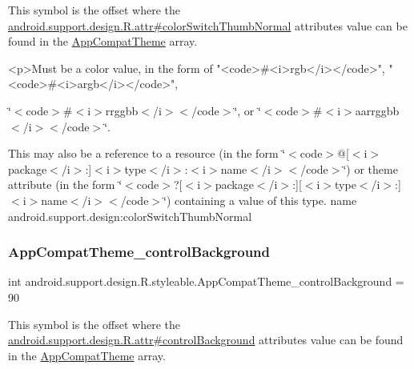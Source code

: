 This symbol is the offset where the \hyperlink{classandroid_1_1support_1_1design_1_1R_1_1attr_a64c4b3a099566cfb653a1354c14bc4dd}{android.\+support.\+design.\+R.\+attr\#color\+Switch\+Thumb\+Normal} attribute\textquotesingle{}s value can be found in the \hyperlink{classandroid_1_1support_1_1design_1_1R_1_1styleable_afb351dc8de20cbd4c89abe360373010c}{App\+Compat\+Theme} array.

\begin{DoxyVerb}      <p>Must be a color value, in the form of "<code>#<i>rgb</i></code>", "<code>#<i>argb</i></code>",
\end{DoxyVerb}
 \char`\"{}$<$code$>$\#$<$i$>$rrggbb$<$/i$>$$<$/code$>$\char`\"{}, or \char`\"{}$<$code$>$\#$<$i$>$aarrggbb$<$/i$>$$<$/code$>$\char`\"{}. 

This may also be a reference to a resource (in the form \char`\"{}$<$code$>$@\mbox{[}$<$i$>$package$<$/i$>$\+:\mbox{]}$<$i$>$type$<$/i$>$\+:$<$i$>$name$<$/i$>$$<$/code$>$\char`\"{}) or theme attribute (in the form \char`\"{}$<$code$>$?\mbox{[}$<$i$>$package$<$/i$>$\+:\mbox{]}\mbox{[}$<$i$>$type$<$/i$>$\+:\mbox{]}$<$i$>$name$<$/i$>$$<$/code$>$\char`\"{}) containing a value of this type.  name android.\+support.\+design\+:color\+Switch\+Thumb\+Normal \mbox{\label{classandroid_1_1support_1_1design_1_1R_1_1styleable_aea175cd3ba91e27d8d492e92dd519ac9}} 
\subsubsection{\texorpdfstring{App\+Compat\+Theme\+\_\+control\+Background}{AppCompatTheme\_controlBackground}}
{\footnotesize\ttfamily int android.\+support.\+design.\+R.\+styleable.\+App\+Compat\+Theme\+\_\+control\+Background = 90\hspace{0.3cm}{\ttfamily [static]}}

This symbol is the offset where the \hyperlink{classandroid_1_1support_1_1design_1_1R_1_1attr_a57739b7431147c97b63f735fadc35054}{android.\+support.\+design.\+R.\+attr\#control\+Background} attribute\textquotesingle{}s value can be found in the \hyperlink{classandroid_1_1support_1_1design_1_1R_1_1styleable_afb351dc8de20cbd4c89abe360373010c}{App\+Compat\+Theme} array.

